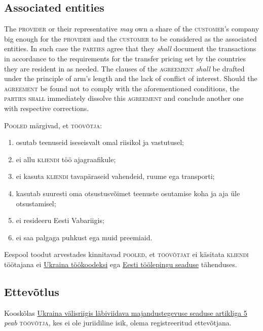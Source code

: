 \begin{Form}
\begin{paracol}{3}
{        \subsection{Associated entities}
        The \textsc{provider} or their representative \textit{may} own a share of the \textsc{customer}'s company big enough for the \textsc{provider} and the \textsc{customer} to be considered as the associated entities. In such case the \textsc{parties} agree that they \textit{shall} document the transactions in accordance to the requirements for the transfer pricing set by the countries they are resident in as needed. The clauses of the \textsc{agreement} \textit{shall} be drafted under the principle of arm's length and the lack of conflict of interest. Should the \textsc{agreement} be found not to comply with the aforementioned conditions, the \textsc{parties} \textsc{shall} immediately dissolve this \textsc{agreement} and conclude another one with respective corrections.
        }
        {P\textsc{ooled} märgivad, et \textsc{töövõtja}:
        \begin{enumerate}
          \item osutab teenuseid iseseisvalt omal riisikol ja vastutusel;\\
          \item ei allu \textsc{kliendi} töö ajagraafikule;\\
          \item ei kasuta \textsc{kliendi} tavapäraseid vahendeid, ruume ega transporti;\\
          \item kasutab suuresti oma otsustusvõimet teenuste osutamise koha ja aja üle otsustamisel;\\
          \item ei resideeru Eesti Vabariigis;
          \item ei saa palgaga puhkust ega muid preemiaid.
        \end{enumerate}

        Eespool toodut arvestades kinnitavad \textsc{pooled}, et \textsc{töövõtjat} ei käsitata \textsc{kliendi} töötajana ei \href{http://zakon2.rada.gov.ua/laws/show/322-08}{Ukraina töökoodeksi} ega \href{https://www.riigiteataja.ee/akt/122122012030}{Eesti töölepingu seaduse} tähenduses.

        \subsection{Ettevõtlus}
        Kooskõlas \href{http://zakon3.rada.gov.ua/laws/show/959-12/parao138\#o138}{Ukraina välisriigis läbiviidava majandustegevuse seaduse artikliga 5} \emph{peab} \textsc{töövõtja}, kes ei ole juriidiline isik, olema registreeritud ettevõtjana.

}
\end{paracol}
\end{Form}
